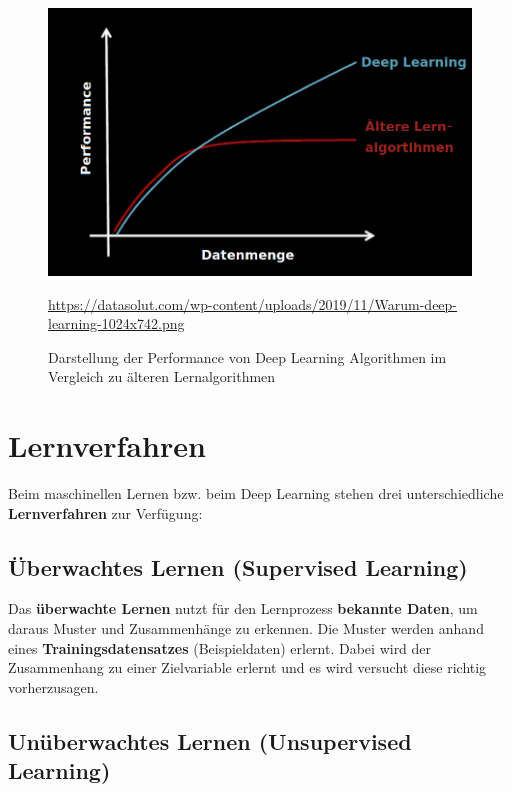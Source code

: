 \begin{figure}[H]
	\centering
	\includegraphics[scale=0.4]{kapitel3/images/Deep_Learning_Performance.png}
	\label{fig:deep-learning-performance}
	\caption{Darstellung der Performance von Deep Learning Algorithmen im Vergleich zu älteren Lernalgorithmen}
	\vspace{0.2cm}
	\quelle\url{https://datasolut.com/wp-content/uploads/2019/11/Warum-deep-learning-1024x742.png}
\end{figure}

\section{Lernverfahren}

Beim maschinellen Lernen bzw. beim Deep Learning stehen drei unterschiedliche \textbf{Lernverfahren} zur Verfügung:

\subsection{Überwachtes Lernen (Supervised Learning)}

	Das \textbf{überwachte Lernen} nutzt für den Lernprozess \textbf{bekannte Daten}, um daraus Muster und Zusammenhänge zu erkennen. Die Muster werden  anhand eines \textbf{Trainingsdatensatzes} (Beispieldaten) erlernt. Dabei wird der Zusammenhang zu einer Zielvariable erlernt und es wird versucht diese richtig vorherzusagen. \cite{datasolut3}

\subsection{Unüberwachtes Lernen (Unsupervised Learning)}

